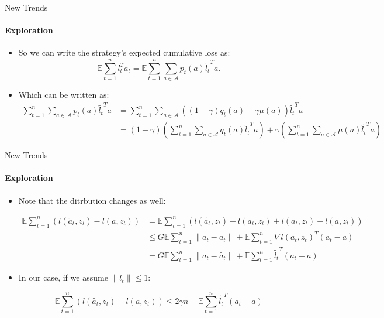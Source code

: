 \documentclass{beamer}
\newcommand{\E}{\mathbb{E}}
\newcommand{\Ayp}{\mathcal{A}}
\begin{document}
\begin{frame}{New Trends}
\framesubtitle{Exploration}

\begin{itemize}
\item 
So we can write the strategy’s expected cumulative loss as:
$$ \E \sum_{t=1}^n l_t^T a_t= \E \sum_{t=1}^n \sum_{a \in \Ayp} p_t(a) \tilde{l_t}^T a.$$


\pause
\item
Which can be written as:
\begin{align*}
\sum_{t=1}^n \sum_{a \in \Ayp} p_t(a) \tilde{l_t}^T a &= \sum_{t=1}^n \sum_{a \in \Ayp} ((1-\gamma) q_t(a)+ \gamma \mu(a)) \tilde{l_t}^T a\\
&=  (1-\gamma)(\sum_{t=1}^n \sum_{a \in \Ayp} q_t(a) \tilde{l_t}^T a) + \gamma  (\sum_{t=1}^n \sum_{a \in \Ayp} \mu(a) \tilde{l_t}^T a)
\end{align*}


\end{itemize}

\end{frame}


\begin{frame}{New Trends}
\framesubtitle{Exploration}

\begin{itemize}
\item
Note that the ditrbution changes as well:

\begin{align*}
\E \sum_{t=1}^n (l(\tilde{a_t}, z_t)- l({a}, z_t)) &= \E \sum_{t=1}^n (l(\tilde{a_t}, z_t)- l({a_t}, z_t) + l({a_t}, z_t)- l({a}, z_t))\\
& \leq G \E \sum_{t=1}^n \|a_t-\tilde{a_t} \| + \E  \sum_{t=1}^n \nabla l(a_t, z_t)^T (a_t-a)\\
&= G \E \sum_{t=1}^n \|a_t-\tilde{a_t} \| + \E  \sum_{t=1}^n \tilde{l_t}^T (a_t-a)
\end{align*}

\item
In our case, if we assume $\| l_t \| \leq 1$:

$$\E \sum_{t=1}^n (l(\tilde{a_t}, z_t)- l({a}, z_t)) \leq 2 \gamma n + \E  \sum_{t=1}^n \tilde{l_t}^T (a_t-a)$$

\end{itemize}

\end{frame}
\end{document}
